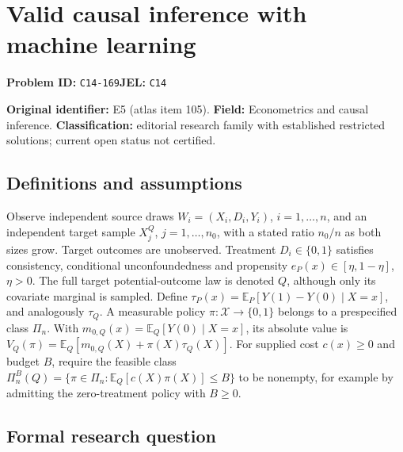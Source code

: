 \documentclass[11pt,a4paper]{article}
\begin{document}
\section*{Valid causal inference with machine learning}
\textbf{Problem ID:} \texttt{C14-169}\quad \textbf{JEL:} \texttt{C14}\par
\label{problem:OP-0105}
\label{atlas:prob:E5}

\noindent\textbf{Original identifier:} E5 (atlas item 105). \textbf{Field:} Econometrics and causal inference. \textbf{Classification:} editorial research family with established restricted solutions; current open status not certified.

\subsection*{Definitions and assumptions}

Observe independent source draws $W_i=(X_i,D_i,Y_i)$, $i=1,\ldots,n$, and an independent target sample $X_j^Q$, $j=1,\ldots,n_0$, with a stated ratio $n_0/n$ as both sizes grow. Target outcomes are unobserved. Treatment $D_i\in\{0,1\}$ satisfies consistency, conditional unconfoundedness and propensity $e_P(x)\in[\eta,1-\eta]$, $\eta>0$. The full target potential-outcome law is denoted $Q$, although only its covariate marginal is sampled. Define $\tau_P(x)=\mathbb E_P[Y(1)-Y(0)\mid X=x]$, and analogously $\tau_Q$. A measurable policy $\pi:\mathcal X\to\{0,1\}$ belongs to a prespecified class $\Pi_n$. With $m_{0,Q}(x)=\mathbb E_Q[Y(0)\mid X=x]$, its absolute value is $V_Q(\pi)=\mathbb E_Q[m_{0,Q}(X)+\pi(X)\tau_Q(X)]$. For supplied cost $c(x)\ge0$ and budget $B$, require the feasible class $\Pi_n^B(Q)=\{\pi\in\Pi_n:\mathbb E_Q[c(X)\pi(X)]\le B\}$ to be nonempty, for example by admitting the zero-treatment policy with $B\ge0$.

\subsection*{Formal research question}
\end{document}
